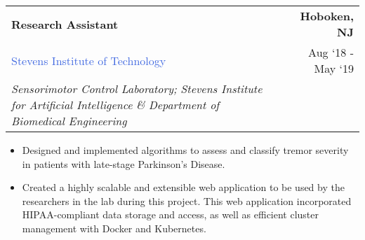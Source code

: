 \documentclass[10pt]{article}
\newcommand{\highlightcolor}{RoyalBlue}
\newcommand{\tabularxwidth}{\textwidth}
\begin{document}
    \begin{minipage}{\tabularxwidth}

        \begin{tabularx}{\tabularxwidth}{X r}
            \textbf{Research Assistant} & \textbf{Hoboken, 
        NJ} \\
            
    
    
    
    

    
        \textcolor{\highlightcolor}{Stevens Institute of Technology} & 
        
    Aug ‘18 - 
    May ‘19 \\
        
            \textit{Sensorimotor Control Laboratory;}
                \textit{Stevens Institute for Artificial Intelligence} \textit{\&}
                \textit{Department of Biomedical Engineering} & \\
        
    
            
        \end{tabularx}

        \begin{itemize}[noitemsep, topsep=3pt, parsep=0pt, partopsep=0pt]
            
                \item 
    Designed and implemented algorithms to assess and classify tremor severity in patients with late-stage Parkinson's Disease.
            
                \item 
    Created a highly scalable and extensible web application to be used by the researchers in the lab during this project. This web application incorporated HIPAA-compliant data storage and access, as well as efficient cluster management with Docker and Kubernetes.
            

\end{itemize}
\end{minipage}
\end{document}
